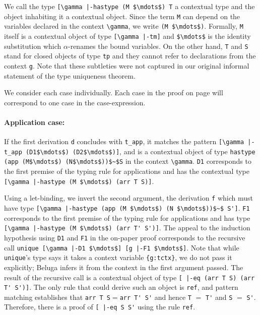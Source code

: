 We call the type \lstinline![\gamma |-hastype (M $\mdots$) T! a contextual type and
the object inhabiting it a contextual object.
Since the term \lstinline!M! can depend on the variables declared in the
context \lstinline!\gamma!, we  write  \lstinline!(M $\mdots$)!. Formally,
\lstinline!M! itself is a contextual object of type
\lstinline![\gamma |-tm]! and \lstinline!$\mdots$! is the identity substitution
which $\alpha$-renames the bound variables.
On the other hand, \lstinline!T! and \lstinline!S! stand for closed
objects of type \lstinline!tp! and they cannot refer to declarations
from the context \lstinline!g!. Note that these subtleties were not
captured in our original informal statement of the type uniqueness
theorem.

We consider each case individually. Each case in the proof on page
\pageref{sec:thmunique} will correspond to one case in the
case-expression.
%
\paragraph{Application case:} If the first derivation \lstinline{d} concludes
with \lstinline{t_app}, it matches
the pattern \lstinline![\gamma |-t_app (D1$\mdots$) (D2$\mdots$)]!, and is
a contextual object of type
\lstinline!hastype (app (M$\mdots$) (N$\mdots$))$~$S! in the context \lstinline!\gamma!.  %
\lstinline!D1! corresponds to the first
premise of the typing rule for applications and has the contextual type
\lstinline![\gamma |-hastype (M $\mdots$) (arr T S)]!.

Using a let-binding, we invert the second
argument, the derivation \lstinline{f} which
must have type
\lstinline![\gamma |-hastype (app (M $\mdots$) (N $\mdots$))$~$ S']!. \lstinline!F1!
corresponds to the first premise of the typing rule for applications
and has type \lstinline![\gamma |-hastype (M $\mdots$) (arr T' S')]!.
The appeal to the induction hypothesis using \lstinline{D1} and \lstinline{F1} in the
on-paper proof
corresponds to the recursive call
 \lstinline!unique [\gamma |-D1 $\mdots$] [g |-F1 $\mdots$]!.
Note that while \lstinline!unique!'s type says it takes a context variable \lstinline!{g:tctx}!,
we do not pass it explicitly; Beluga infers it from the context in the first argument
passed.
The result of the recursive call is a contextual object of type
\lstinline![ |-eq (arr T S) (arr T' S')]!. The only rule that
could derive such an object is \lstinline{ref}, and pattern matching
establishes that \lstinline!arr T S!$=$\lstinline!arr T' S'! and hence
\lstinline!T! $=$ \lstinline!T'! and \lstinline!S! $=$ \lstinline!S'!.
Therefore, there is a proof of \lstinline![ |-eq S S'! using the
rule \lstinline!ref!.

